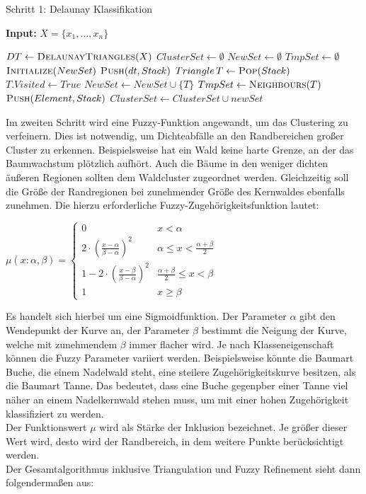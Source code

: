 \documentclass[11pt,ceqn]{book}
\begin{document}
\begin{algorithm}[H]
\caption{ Schritt 1: Delaunay Klassifikation}\label{nsfcdt}
\hspace*{\algorithmicindent} \textbf{Input:} $X=\{x_1,\dots,x_n\}$ 
\begin{algorithmic}[1]
\State $DT \gets \textsc{Delaunay}\textsc{Triangles}(X)$
\State $ClusterSet \gets \emptyset$
\State $NewSet \gets \emptyset$
\State $TmpSet \gets \emptyset$
\State $\textsc{Initialize}(NewSet)$
\State $\textsc{Push}(dt,Stack)$
\State $Triangle\,T \gets \textsc{Pop}(Stack)$
\State $T.Visited \gets True$
\State $NewSet \gets NewSet \cup \{T\}$
\State $TmpSet \gets \textsc{Neighbours}(T)$
\State $\textsc{Push}(Element,Stack)$
\EndIf
\EndFor
\EndIf
\EndWhile
\State $ClusterSet \gets ClusterSet \cup newSet$
\EndIf
\EndFor
\end{algorithmic}
\end{algorithm}

Im zweiten Schritt wird eine Fuzzy-Funktion angewandt, um das Clustering zu verfeinern. Dies ist notwendig, um Dichteabfälle an den Randbereichen großer Cluster zu erkennen. Beispielsweise hat ein Wald keine harte Grenze, an der das Baumwachstum plötzlich aufhört. Auch die Bäume in den weniger dichten äußeren Regionen sollten dem Waldcluster zugeordnet werden. Gleichzeitig soll die Größe der Randregionen bei zunehmender Größe des Kernwaldes ebenfalls zunehmen. Die hierzu erforderliche Fuzzy-Zugehörigkeitsfunktion lautet:

$\mu(x:\alpha,\beta) = \left\{
\begin{array}{ll}
0 & x < \alpha \\
2\cdot\left(\frac{x-\alpha}{\beta-\alpha}\right)^2 & \alpha \leqslant x < \frac{\alpha + \beta}{2} \\
1-2\cdot\left(\frac{x-\beta}{\beta-\alpha}\right)^2 & \frac{\alpha + \beta}{2} \leqslant x < \beta \\
1 & x \geqslant \beta
\end{array}
\right. $

Es handelt sich hierbei um eine Sigmoidfunktion. Der Parameter $\alpha$ gibt den Wendepunkt der Kurve an, der Parameter $\beta$ bestimmt die Neigung der Kurve, welche mit zunehmendem $\beta$ immer flacher wird. Je nach Klasseneigenschaft können die Fuzzy Parameter variiert werden. Beispielsweise könnte die Baumart Buche, die einem Nadelwald steht, eine steilere Zugehörigkeitskurve besitzen, als die Baumart Tanne. Das bedeutet, dass eine Buche gegenpber einer Tanne viel näher an einem Nadelkernwald stehen muss, um mit einer hohen Zugehörigkeit klassifiziert zu werden. 
\\
Der Funktionswert $\mu$ wird als Stärke der Inklusion bezeichnet. Je größer dieser Wert wird, desto wird der Randbereich, in dem weitere Punkte berücksichtigt werden.\\
Der Gesamtalgorithmus inklusive Triangulation und Fuzzy Refinement sieht dann folgendermaßen aus:
\end{document}
